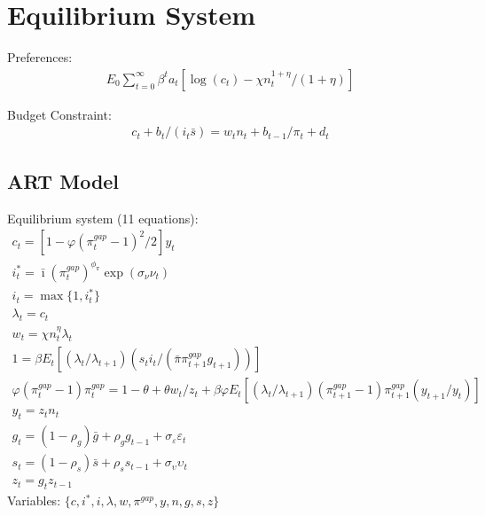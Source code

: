 \documentclass[12pt, final]{article}
\begin{document}
\section{Equilibrium System}

\noindent Preferences:
\begin{gather*}
  E_0\textstyle\sum_{t=0}^\infty\beta^t a_t[\log(c_t)-\chi n_t^{1+\eta}/(1+\eta)]
\end{gather*}

\noindent Budget Constraint:
\begin{gather*}
  c_t+b_t/(i_t\bar{s})=w_tn_t+b_{t-1}/\pi_t+d_t
\end{gather*}

\setcounter{equation}{0}
\subsection{ART Model}
\noindent Equilibrium system (11 equations):
\small\begin{gather}
c_t = [1-\varphi(\pi_t^{gap}-1)^2/2]y_t\\
i_t^*=\bar{\imath}(\pi^{gap}_t)^{\phi_\pi}\exp(\sigma_\nu\nu_t)\\
i_t=\max\{1,i_t^*\}\\
\lambda_t = c_t \\
w_t = \chi n_t^\eta \lambda_t\\
1 =  \beta E_t[(\lambda_t/\lambda_{t+1})(s_ti_t/(\bar{\pi}\pi_{t+1}^{gap}g_{t+1}))]\\
\varphi(\pi_t^{gap}-1)\pi_t^{gap} = 1-\theta + \theta w_t/z_t + \beta\varphi E_t[(\lambda_t/\lambda_{t+1})(\pi_{t+1}^{gap}-1)\pi_{t+1}^{gap}(y_{t+1}/y_t)]\\
  y_t=z_t n_t\\  
  g_t= (1-\rho_g)\bar{g}+\rho_gg_{t-1} + \sigma_\varepsilon\varepsilon_t \\
  s_t=(1-\rho_s)\bar{s}+\rho_ss_{t-1} + \sigma_\upsilon\upsilon_t\\
  z_t=g_tz_{t-1}
\end{gather}\normalsize
Variables: $\{c,i^*,i,\lambda,w,\pi^{gap},y,n,g,s,z\}$\\
\end{document}
